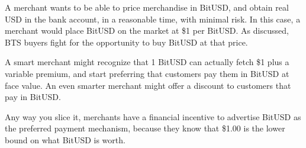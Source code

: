 A merchant wants to be able to price merchandise in BitUSD, and obtain real USD
in the bank account, in a reasonable time, with minimal risk. In this case, a
merchant would place BitUSD on the market at \$1 per BitUSD. As discussed, BTS
buyers fight for the opportunity to buy BitUSD at that price.

A smart merchant might recognize that 1 BitUSD can actually fetch \$1 plus a
variable premium, and start preferring that customers pay them in BitUSD at
face value. An even smarter merchant might offer a discount to customers that
pay in BitUSD.

Any way you slice it, merchants have a financial incentive to advertise BitUSD
as the preferred payment mechanism, because they know that \$1.00 is the lower
bound on what BitUSD is worth.
